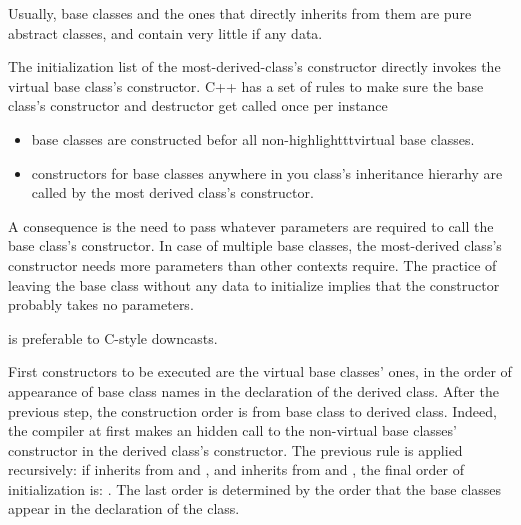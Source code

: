 \vspace{-1cm}
Usually,  base classes and the ones that directly 
inherits from them are pure abstract classes, and contain very little 
if any data.

The initialization list of the most-derived-class's constructor directly 
invokes the virtual base class's constructor.
\newline
C++ has a set of rules to make sure the  base 
class's constructor and destructor get called once per instance
\begin{itemize}
    \item {} base classes are constructed befor all 
    non-highlighttt{virtual} base classes.
    \item constructors for  base classes anywhere 
    in you class's inheritance hierarhy are called by the most derived 
    class's constructor.
\end{itemize}
A consequence is the need to pass whatever parameters are required to call 
the  base class's constructor. In case of multiple 
 base classes, the most-derived class's constructor 
needs more parameters than other contexts require.
\newline
The practice of leaving the  base class without any 
data to initialize implies that the constructor probably takes no 
parameters.

 is preferable to C-style downcasts.
 
First constructors to be executed are the virtual base classes' ones, 
in the order of appearance of base class names in the declaration of 
the derived class.
\newline
After the previous step, the construction order is from base class to 
derived class. Indeed, the compiler at first makes an hidden call to 
the non-virtual base classes' constructor in the derived class's 
constructor.
\newline
The previous rule is applied recursively: if  inherits 
from  and , and 
inherits from  and , the final order 
of initialization is: \newline
{}.
\newline
The last order is determined by the order that the base classes appear 
in the declaration of the class.

